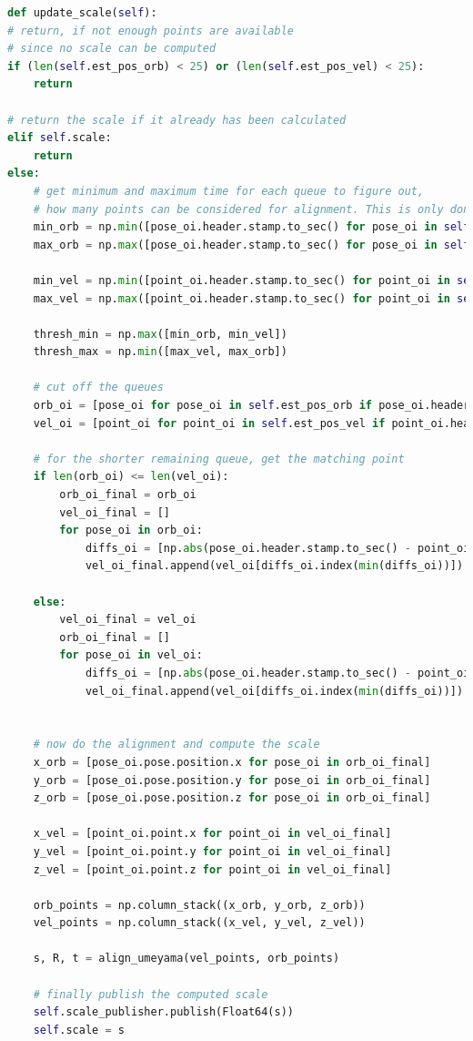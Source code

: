 	
	\begin{lstlisting}[language=python, caption=Main part of the scale estimation node, label=lst:scaleup]
def update_scale(self):
# return, if not enough points are available
# since no scale can be computed
if (len(self.est_pos_orb) < 25) or (len(self.est_pos_vel) < 25):
	return

# return the scale if it already has been calculated    
elif self.scale:
	return
else:
	# get minimum and maximum time for each queue to figure out, 
	# how many points can be considered for alignment. This is only done once!
	min_orb = np.min([pose_oi.header.stamp.to_sec() for pose_oi in self.est_pos_orb])
	max_orb = np.max([pose_oi.header.stamp.to_sec() for pose_oi in self.est_pos_orb])

	min_vel = np.min([point_oi.header.stamp.to_sec() for point_oi in self.est_pos_vel])
	max_vel = np.max([point_oi.header.stamp.to_sec() for point_oi in self.est_pos_vel])

	thresh_min = np.max([min_orb, min_vel])
	thresh_max = np.min([max_vel, max_orb])

	# cut off the queues
	orb_oi = [pose_oi for pose_oi in self.est_pos_orb if pose_oi.header.stamp.to_sec() > thresh_min]
	vel_oi = [point_oi for point_oi in self.est_pos_vel if point_oi.header.stamp.to_sec() > thresh_min]

	# for the shorter remaining queue, get the matching point
	if len(orb_oi) <= len(vel_oi): 
		orb_oi_final = orb_oi
		vel_oi_final = []
		for pose_oi in orb_oi: 
			diffs_oi = [np.abs(pose_oi.header.stamp.to_sec() - point_oi.header.stamp.to_sec()) for point_oi in vel_oi]
			vel_oi_final.append(vel_oi[diffs_oi.index(min(diffs_oi))])

	else:
		vel_oi_final = vel_oi
		orb_oi_final = []
		for pose_oi in vel_oi: 
			diffs_oi = [np.abs(pose_oi.header.stamp.to_sec() - point_oi.header.stamp.to_sec()) for point_oi in orb_oi]
			vel_oi_final.append(vel_oi[diffs_oi.index(min(diffs_oi))])


	# now do the alignment and compute the scale
	x_orb = [pose_oi.pose.position.x for pose_oi in orb_oi_final]
	y_orb = [pose_oi.pose.position.y for pose_oi in orb_oi_final]
	z_orb = [pose_oi.pose.position.z for pose_oi in orb_oi_final]

	x_vel = [point_oi.point.x for point_oi in vel_oi_final]
	y_vel = [point_oi.point.y for point_oi in vel_oi_final]
	z_vel = [point_oi.point.z for point_oi in vel_oi_final]
	
	orb_points = np.column_stack((x_orb, y_orb, z_orb))
	vel_points = np.column_stack((x_vel, y_vel, z_vel))

	s, R, t = align_umeyama(vel_points, orb_points)

	# finally publish the computed scale 
	self.scale_publisher.publish(Float64(s))
	self.scale = s
	\end{lstlisting}
	
